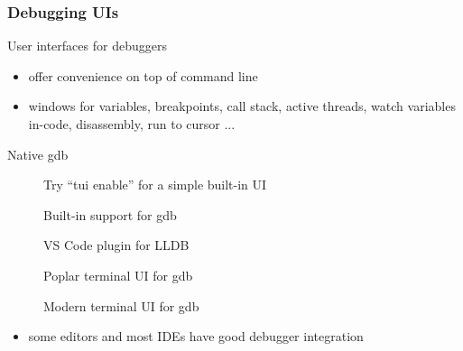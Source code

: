 \begin{frame}[fragile]
  \frametitle{Debugging UIs}
  \begin{block}{User interfaces for debuggers}
    \begin{itemize}
      \item offer convenience on top of command line
      \item windows for variables, breakpoints, call stack, active threads, watch variables in-code, disassembly, run to cursor ...
    \end{itemize}
    \begin{description}
      \item[Native gdb] Try ``tui enable'' for a simple built-in UI
      \item[\href{https://code.visualstudio.com/docs/cpp/cpp-debug}{}]
        Built-in support for gdb
      \item[\href{https://marketplace.visualstudio.com/items?itemName=vadimcn.vscode-lldb}{}]
        VS Code plugin for LLDB
      \item[\href{https://github.com/cyrus-and/gdb-dashboard}{}]
        Poplar terminal UI for gdb
      \item[\href{https://github.com/hugsy/gef}{}]
        Modern terminal UI for gdb
    \end{description}
    \begin{itemize}
      \item some editors and most IDEs have good debugger integration
    \end{itemize}
  \end{block}
\end{frame}

